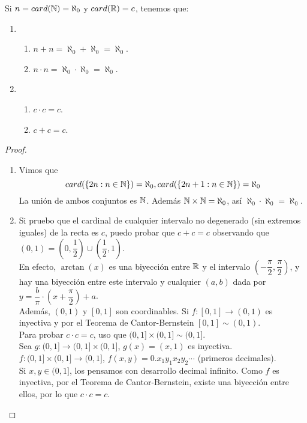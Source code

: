 \begin{eg}
  Si $n = card(\mathbb{N}) = \aleph_0$ y $card(\mathbb{R}) = c$, tenemos que:
  \begin{enumerate}
    \item \begin{enumerate}
            \item $n+n = \aleph_0 + \aleph_0 = \aleph_0$.
            \item $n \cdot n = \aleph_0 \cdot \aleph_0 = \aleph_0$.
          \end{enumerate}
    \item \begin{enumerate}
            \item $c \cdot c = c$.
            \item $c+c = c$.
          \end{enumerate}
  \end{enumerate}

  \begin{proof}
    \begin{enumerate}
      \item Vimos que \begin{equation} card(\{ 2n : n \in \mathbb{N} \}) = \aleph_0, card(\{ 2n+1 : n \in \mathbb{N} \}) = \aleph_0 \end{equation} La unión de ambos conjuntos es $\mathbb{N}$. Además $\mathbb{N} \times \mathbb{N} = \aleph_0$, así $\aleph_0 \cdot \aleph_0 = \aleph_0$.

      \item Si pruebo que el cardinal de cualquier intervalo no degenerado (sin extremos iguales) de la recta es $c$, puedo probar que $c+c=c$ observando que $(0,1) = (0, \dfrac{1}{2}) \cup (\dfrac{1}{2}, 1)$. \\
            En efecto, $\arctan(x)$ es una biyección entre $\mathbb{R}$ y el intervalo $(-\dfrac{\pi}{2}, \dfrac{\pi}{2})$, y hay una biyección entre este intervalo y cualquier $(a, b)$ dada por $y = \dfrac{b}{\pi} \cdot (x + \dfrac{\pi}{2}) + a$. \\
            Además, $(0, 1)$ y $[0, 1]$ son coordinables. Si $f: [0, 1] \to (0, 1)$ es inyectiva y por el Teorema de Cantor-Bernstein $[0, 1] \sim (0, 1)$. \\
            Para probar $c \cdot c = c$, uso que $(0, 1] \times (0, 1] \sim (0, 1]$. \\
            Sea $g: (0, 1] \to (0, 1] \times (0, 1]$, $g(x) = (x, 1)$ es inyectiva. \\
            $f: (0, 1] \times (0, 1] \to (0, 1]$, $f(x, y) = 0.x_1y_1x_2y_2\cdots$ (primeros decimales). \\
            Si $x, y \in (0, 1]$, los pensamos con desarrollo decimal infinito. Como $f$ es inyectiva, por el Teorema de Cantor-Bernstein, existe una biyección entre ellos, por lo que $c \cdot c = c$.
    \end{enumerate}
  \end{proof}
\end{eg}

